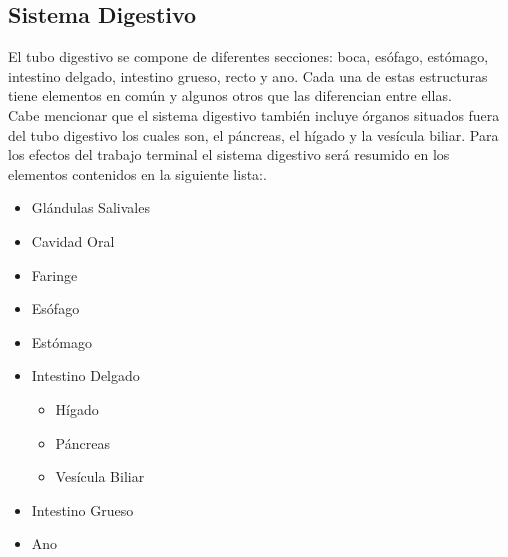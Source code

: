 \subsection{Sistema Digestivo}
El tubo digestivo se compone de diferentes secciones: boca, esófago, estómago, intestino delgado, intestino grueso, recto y ano. Cada una de estas estructuras tiene elementos en común y algunos otros que las diferencian entre ellas.\cite{rouviere2005anatomia}\\ 
Cabe mencionar que el sistema digestivo también incluye órganos situados fuera del tubo digestivo los cuales son, el páncreas, el hígado y la vesícula biliar. Para los efectos del trabajo terminal el sistema digestivo será resumido en los elementos contenidos en la siguiente lista:\cite{rohen2018anatomy2}.\\
\begin{itemize}
  \item Glándulas Salivales
  \item Cavidad Oral
  \item Faringe
  \item Esófago
  \item Estómago
  \item Intestino Delgado
  \begin{itemize}
    \item Hígado
    \item Páncreas
    \item Vesícula Biliar
  \end{itemize}
  \item Intestino Grueso
  \item Ano  
\end{itemize}

